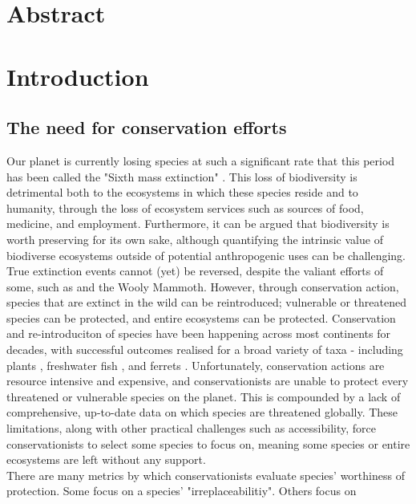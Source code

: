 \documentclass[11pt]{article}
\begin{document}
\linenumbers

\section{Abstract}
\noindent


	
	\section{Introduction}
	\noindent

\subsection{The need for conservation efforts }
Our planet is currently losing species at such a significant rate that this 
period has been called the "Sixth mass extinction" 
\autocite{Barnosky2011}. This loss of biodiversity is detrimental both to the 
ecosystems in which these species reside and to humanity, through the loss of 
ecosystem services such as sources of food, medicine, and employment. 
Furthermore, it can be argued that biodiversity is worth preserving for its own 
sake, although quantifying the intrinsic value of biodiverse ecosystems outside 
of potential anthropogenic uses can be challenging. 
True extinction events cannot (yet) be reversed, despite the valiant efforts of 
some, such as \cite{Piotrowska2018} and the Wooly Mammoth. However, 
through conservation action, species that are extinct in the wild can be 
reintroduced; vulnerable or threatened species can be protected, and entire 
ecosystems can be protected. Conservation and re-introduciton of species have 
been happening across most continents for decades, with successful outcomes 
realised for a broad variety of taxa - including plants 
\autocite{Godefroid2011}, freshwater fish \autocite{Cochran-Biederman2015}, 
and ferrets \autocite{Jachowski2011}. Unfortunately, conservation actions are
resource intensive and expensive, and conservationists are unable to protect 
every threatened or vulnerable species on the planet. This is compounded by a 
lack of comprehensive, up-to-date data on which species are threatened 
globally. These limitations, along with other practical challenges such as 
accessibility, force conservationists to select some species to focus on, 
meaning some species or entire ecosystems are left without any support.
\\ 
 There are many metrics by which conservationists evaluate species' worthiness 
 of 
protection. Some focus on a species' "irreplaceabilitiy". Others focus on 
\end{document}
